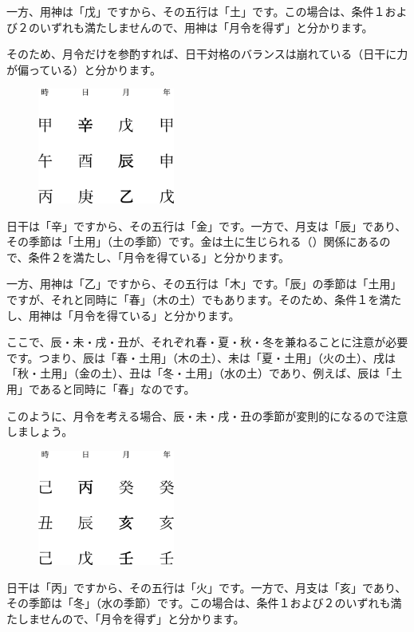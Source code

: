 \documentclass[a5paper,11pt,dvipdfmx]{tarticle}
\begin{document}
一方、用神は「戊」ですから、その五行は「土」です。この場合は、条件１および２のいずれも満たしませんので、用神は「月令を得ず」と分かります。

そのため、月令だけを参酌すれば、日干対格のバランスは崩れている（日干に力が偏っている）と分かります。

\begin{figure}[h]
  \includegraphics[width=45mm,angle=90]{figs/figure6-2.eps}
\end{figure}

日干は「辛」ですから、その五行は「金」です。一方で、月支は「辰」であり、その季節は「土用」（土の季節）です。金は土に生じられる（）関係にあるので、条件２を満たし、「月令を得ている」と分かります。

一方、用神は「乙」ですから、その五行は「木」です。「辰」の季節は「土用」ですが、それと同時に「春」（木の土）でもあります。そのため、条件１を満たし、用神は「月令を得ている」と分かります。

ここで、辰・未・戌・丑が、それぞれ春・夏・秋・冬を兼ねることに注意が必要です。つまり、辰は「春・土用」（木の土）、未は「夏・土用」（火の土）、戌は「秋・土用」（金の土）、丑は「冬・土用」（水の土）であり、例えば、辰は「土用」であると同時に「春」なのです。

このように、月令を考える場合、辰・未・戌・丑の季節が変則的になるので注意しましょう。

\begin{figure}[h]
  \includegraphics[width=45mm,angle=90]{figs/figure6-3.eps}
\end{figure}

日干は「丙」ですから、その五行は「火」です。一方で、月支は「亥」であり、その季節は「冬」（水の季節）です。この場合は、条件１および２のいずれも満たしませんので、「月令を得ず」と分かります。
\end{document}
